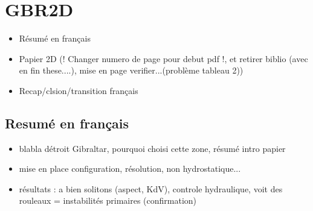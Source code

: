 \documentclass[a4paper,12pt,notitlepage]{report}
\numberwithin{equation}{section}
\begin{document}


\chapter{GBR2D}
\begin{itemize}
\item R\'esum\'e en français
\item Papier 2D (! Changer numero de page pour debut pdf !, et retirer biblio (avec en fin these....), mise en page verifier...(problème tableau 2))
\item Recap/clsion/transition français
\end{itemize}

\section{Resumé en français}
\begin{itemize}
\item blabla détroit Gibraltar, pourquoi choisi cette zone, résumé intro papier
\item mise en place configuration, résolution, non hydrostatique...
\item résultats : a bien solitons (aspect, KdV), controle hydraulique, voit des rouleaux = instabilités primaires (confirmation)
\end{itemize}
\end{document}
